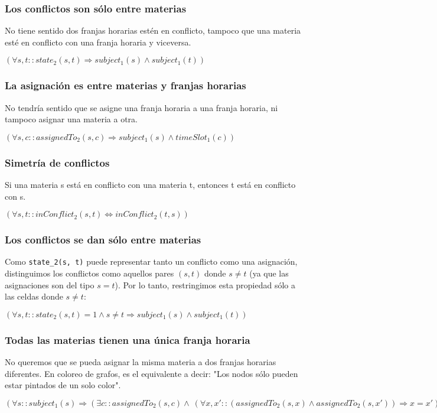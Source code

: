 \documentclass[a4paper,11pt]{article}
\begin{document}
\subsubsection{Los conflictos son sólo entre materias}
No tiene sentido dos franjas horarias estén en conflicto, tampoco que una materia esté en conflicto con una franja horaria y viceversa.
\begin{center}
    $(\forall s, t :: state_2(s,t) \Rightarrow subject_1(s) \land subject_1(t) )$
\end{center}



\subsubsection{La asignación es entre materias y franjas horarias}
No tendría sentido que se asigne una franja horaria a una franja horaria, ni tampoco asignar una materia a otra.
\begin{center}
    $(\forall s, c :: assignedTo_2(s, c) \Rightarrow subject_1(s) \land timeSlot_1(c))$
\end{center}

\subsubsection{Simetría de conflictos}
Si una materia s está en conflicto con una materia t, entonces t está en conflicto con s.
\begin{center}
    $(\forall s, t :: inConflict_2(s,t) \Leftrightarrow inConflict_2(t, s))$
\end{center}
\subsubsection{Los conflictos se dan sólo entre materias}

Como \texttt{state\_2(s, t)} puede representar tanto un conflicto como una asignación, distinguimos los conflictos como aquellos pares $(s, t)$ donde $s \ne t$ (ya que las asignaciones son del tipo $s = t$). Por lo tanto, restringimos esta propiedad sólo a las celdas donde $s \ne t$:

\begin{center}
    $(\forall s, t :: state_2(s, t) = 1 \land s \ne t \Rightarrow subject_1(s) \land subject_1(t))$
\end{center}

\subsubsection{Todas las materias tienen una única franja horaria}
No queremos que se pueda asignar la misma materia a dos franjas horarias diferentes. En coloreo de grafos, es el equivalente a decir: "Los nodos sólo pueden estar pintados de un solo color".
\begin{center}
    $(\forall s :: subject_1(s) \Rightarrow (\exists c :: assignedTo_2(s, c) \land \
        (\forall x, x' :: (assignedTo_2(s, x) \land assignedTo_2(s, x')) \Rightarrow x = x' )
        ))$
\end{center}
\end{document}
